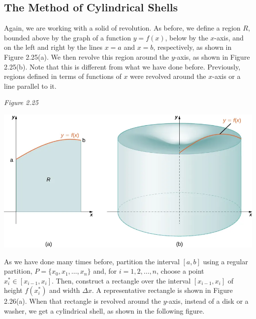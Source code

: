 \documentclass{report}
\begin{document}
    \subsection*{The Method of Cylindrical Shells}
    \bigbreak \noindent 
    \begin{minipage}[]{0.47\textwidth}
           Again, we are working with a solid of revolution. As before, we define a region \( R \),
        bounded above by the graph of a function \( y = f(x) \),
        below by the \( x \)-axis,
        and on the left and right by the lines \( x = a \)
        and \( x = b \),
        respectively, as shown in Figure 2.25(a). We then revolve this region around the \( y \)-axis, as shown in Figure 2.25(b). Note that this is different from what we have done before. Previously, regions defined in terms of functions of \( x \)
        were revolved around the \( x \)-axis
        or a line parallel to it. 
    \end{minipage}
    \begin{minipage}[]{0.47\textwidth}
        \textit{Figure 2.25}
        \begin{center}
            \includegraphics[scale=0.3]{./figures/graph26.png}
        \end{center}
    \end{minipage}
    \bigbreak \noindent 
    \begin{minipage}[]{0.47\textwidth}
        As we have done many times before, partition the interval \([a, b]\)
        using a regular partition, \(P = \{x_0, x_1, \ldots, x_n\}\)
        and, for \(i = 1, 2, \ldots, n\),
        choose a point \(x^*_i \in [x_{i-1}, x_i]\).
        Then, construct a rectangle over the interval \([x_{i-1}, x_i]\)
        of height \(f(x^*_i)\)
        and width \(\Delta x\).
        A representative rectangle is shown in Figure 2.26(a). When that rectangle is revolved around the \(y\)-axis, instead of a disk or a washer, we get a cylindrical shell, as shown in the following figure.
    \end{minipage}
\end{document}
